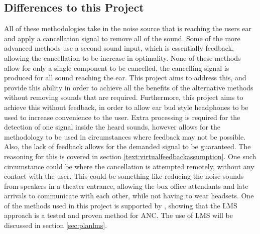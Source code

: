 \subsection{Differences to this Project}
All of these methodologies take in the noise source that is reaching the users ear and apply a cancellation signal to remove all of the sound.
Some of the more advanced methods use a second sound input, which is essentially feedback, allowing the cancellation to be increase in optimality.
None of these methods allow for only a single component to be cancelled, the cancelling signal is produced for all sound reaching the ear.
This project aims to address this, and provide this ability in order to achieve all the benefits of the alternative methods without removing sounds that are required.
Furthermore, this project aims to achieve this without feedback, in order to allow ear bud style headphones to be used to increase convenience to the user.
Extra processing is required for the detection of one signal inside the heard sounds, however allows for the methodology to be used in circumstances where feedback may not be possible.
Also, the lack of feedback allows for the demanded signal to be guaranteed.
The reasoning for this is covered in section \ref{text:virtualfeedbackassumption}.
One such circumstance could be where the cancellation is attempted remotely, without any contact with the user.
This could be something like reducing the noise sounds from speakers in a theater entrance, allowing the box office attendants and late arrivals to communicate with each other, while not having to wear headsets.
One of the methods used in this project is supported by \cite{EMHeadsets,EMNoiseCancel,2SensorANCAlg}, showing that the LMS approach is a tested and proven method for ANC.
The use of LMS will be discussed in section \ref{sec:planlms}.
